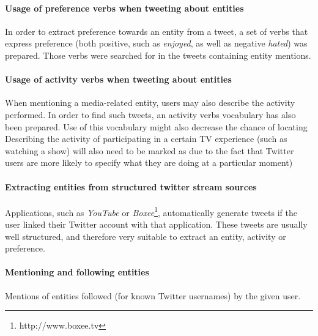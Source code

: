 \paragraph{Usage of preference verbs when tweeting about entities}
In order to extract preference towards an entity from a tweet, a set of verbs
that express preference (both positive, such as \textit{enjoyed}, as well as negative \textit{hated})
was prepared. Those verbs were searched for in the tweets containing entity mentions.
\paragraph{Usage of activity verbs when tweeting about entities}
When mentioning a media-related entity, users may also describe the activity performed.
In order to find such tweets, an activity verbs vocabulary has also been prepared. Use of this vocabulary
might also decrease the chance of locating
Describing the activity of participating in a certain TV experience (such
as watching a show) will also need to be marked as due to the
fact that Twitter users are more likely to specify what they are doing at a
particular moment)
\paragraph{Extracting entities from structured twitter stream sources}
Applications, such as \textit{YouTube} or \textit{Boxee}\footnote{http://www.boxee.tv}, automatically generate tweets
if the user linked their Twitter account with that application. These tweets are
usually well structured, and therefore very suitable to extract an entity, activity or preference.
\paragraph{Mentioning and following entities}
Mentions of entities followed (for known Twitter usernames) by the given user.


